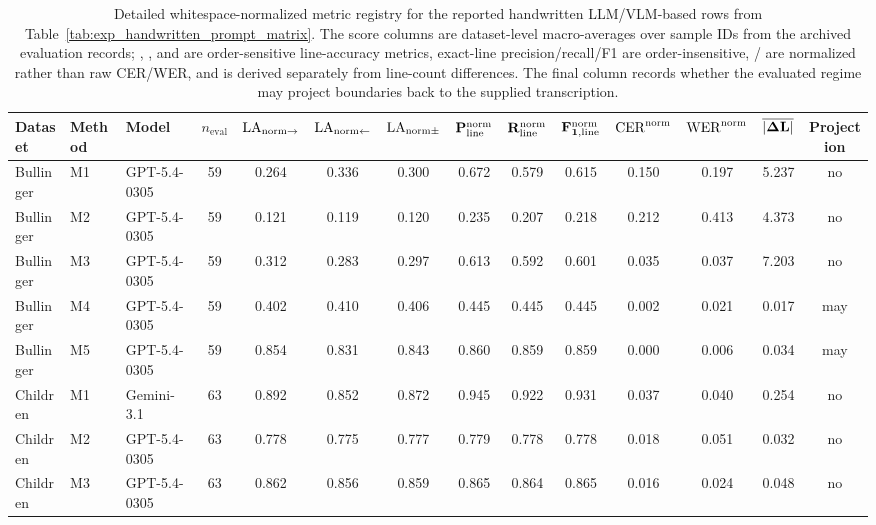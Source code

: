 \begin{landscape}
\begin{table}[p]
  \centering
  \caption{Detailed whitespace-normalized metric registry for the reported handwritten LLM/VLM-based rows from Table~\ref{tab:exp_handwritten_prompt_matrix}. The score columns are dataset-level macro-averages over sample IDs from the archived evaluation records; \LANormForward{}, \LANormReverse{}, and \LANormCombined{} are order-sensitive line-accuracy metrics, exact-line precision/recall/F1 are order-insensitive, \CERNorm{}/\WERNorm{} are normalized rather than raw CER/WER, and \MeanAbsLineDelta{} is derived separately from line-count differences. The final column records whether the evaluated regime may project boundaries back to the supplied transcription.}
  \label{tab:app_handwritten_prompt_detail_metrics}
  \scriptsize
  \setlength{\tabcolsep}{4pt}
  \begin{tabular}{@{}l l l c c c c c c c c c c c@{}}
    \toprule
    \textbf{Dataset} & \textbf{Method} & \textbf{Model} & \textbf{\(n_{\mathrm{eval}}\)} & \(\mathbf{\mathrm{LA}_{\mathrm{norm}\rightarrow}}\) & \(\mathbf{\mathrm{LA}_{\mathrm{norm}\leftarrow}}\) & \(\mathbf{\mathrm{LA}_{\mathrm{norm}\pm}}\) & \(\mathbf{P_{\mathrm{line}}^{\mathrm{norm}}}\) & \(\mathbf{R_{\mathrm{line}}^{\mathrm{norm}}}\) & \(\mathbf{F_{1,\mathrm{line}}^{\mathrm{norm}}}\) & \(\mathbf{\mathrm{CER}^{\mathrm{norm}}}\) & \(\mathbf{\mathrm{WER}^{\mathrm{norm}}}\) & \(\mathbf{\overline{\lvert\Delta L\rvert}}\) & \textbf{Projection} \\
    \midrule
    Bullinger & M1 & GPT-5.4-0305 & 59 & 0.264 & 0.336 & 0.300 & 0.672 & 0.579 & 0.615 & 0.150 & 0.197 & 5.237 & no \\
    Bullinger & M2 & GPT-5.4-0305 & 59 & 0.121 & 0.119 & 0.120 & 0.235 & 0.207 & 0.218 & 0.212 & 0.413 & 4.373 & no \\
    Bullinger & M3 & GPT-5.4-0305 & 59 & 0.312 & 0.283 & 0.297 & 0.613 & 0.592 & 0.601 & 0.035 & 0.037 & 7.203 & no \\
    Bullinger & M4 & GPT-5.4-0305 & 59 & 0.402 & 0.410 & 0.406 & 0.445 & 0.445 & 0.445 & 0.002 & 0.021 & 0.017 & may \\
    Bullinger & M5 & GPT-5.4-0305 & 59 & 0.854 & 0.831 & 0.843 & 0.860 & 0.859 & 0.859 & 0.000 & 0.006 & 0.034 & may \\
    Children & M1 & Gemini-3.1 & 63 & 0.892 & 0.852 & 0.872 & 0.945 & 0.922 & 0.931 & 0.037 & 0.040 & 0.254 & no \\
    Children & M2 & GPT-5.4-0305 & 63 & 0.778 & 0.775 & 0.777 & 0.779 & 0.778 & 0.778 & 0.018 & 0.051 & 0.032 & no \\
    Children & M3 & GPT-5.4-0305 & 63 & 0.862 & 0.856 & 0.859 & 0.865 & 0.864 & 0.865 & 0.016 & 0.024 & 0.048 & no \\

\end{tabular}
\end{table}
\end{landscape}
